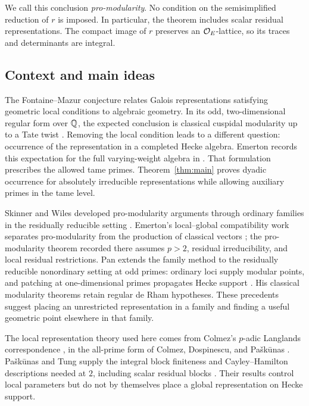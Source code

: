 We call this conclusion \emph{pro-modularity}. No condition on the
semisimplified reduction of $r$ is imposed. In particular, the theorem
includes scalar residual representations. The compact image of $r$
preserves an $\mathcal O_E$-lattice, so its traces and determinants are integral.

\subsection*{Context and main ideas}

The Fontaine--Mazur conjecture relates Galois representations satisfying
geometric local conditions to algebraic geometry.  In its odd,
two-dimensional regular form over $\mathbb Q$, the expected conclusion is
classical cuspidal modularity up to a Tate twist
\cite{FM1995,Pan2022}.  Removing the local condition leads to a different
question: occurrence of the representation in a completed Hecke algebra.
Emerton records this expectation for the full varying-weight algebra in
\cite[Conjecture~2.12]{Emerton2011Families}.  That formulation prescribes
the allowed tame primes.  Theorem~\ref{thm:main} proves dyadic occurrence
for absolutely irreducible representations while allowing auxiliary
primes in the tame level.

Skinner and Wiles developed pro-modularity arguments through ordinary
families in the residually reducible setting
\cite[Introduction and Section~4.1]{SkinnerWiles1999}.
Emerton's local--global compatibility work separates pro-modularity from
the production of classical vectors
\cite[Section~1.2]{Emerton2011}; the pro-modularity theorem recorded there
assumes $p>2$, residual irreducibility, and local residual restrictions.
Pan extends the family method to the residually reducible nonordinary
setting at odd primes: ordinary loci supply modular points, and patching
at one-dimensional primes propagates Hecke support
\cite[Introduction and Theorem~4.1.7]{Pan2022}.
His classical modularity theorems retain regular de Rham hypotheses.
These precedents suggest placing an unrestricted representation in a
family and finding a useful geometric point elsewhere in that family.

The local representation theory used here comes from Colmez's
$p$-adic Langlands correspondence \cite{Colmez2010}, in the all-prime form
of Colmez, Dospinescu, and Pa\v{s}k\=unas
\cite[Theorem~1.1]{CDP2014}.  Pa\v{s}k\=unas and Tung supply the integral
block finiteness and Cayley--Hamilton descriptions needed at $2$,
including scalar residual blocks
\cite[Theorems~1.2--1.4 and Section~4.1]{PaskunasTung2021}.
Their results control local parameters but do not by themselves place a
global representation on Hecke support.

